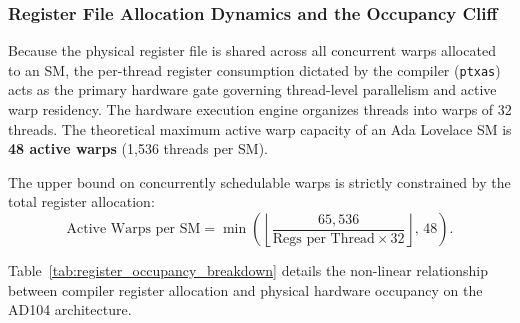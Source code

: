 \subsubsection{Register File Allocation Dynamics and the Occupancy Cliff}
\label{sec:appendix_ada_register_allocation}

Because the physical register file is shared across all concurrent warps allocated to an SM, the per-thread register consumption dictated by the compiler (\texttt{ptxas}) acts as the primary hardware gate governing thread-level parallelism and active warp residency. The hardware execution engine organizes threads into warps of $32$ threads. The theoretical maximum active warp capacity of an Ada Lovelace SM is \textbf{48 active warps} (1,536 threads per SM).

The upper bound on concurrently schedulable warps is strictly constrained by the total register allocation:
\begin{equation}
    \text{Active Warps per SM} = \min \left( \left\lfloor \frac{65,536}{\text{Regs per Thread} \times 32} \right\rfloor, \, 48 \right).
    \label{eq:active_warps_formula}
\end{equation}

Table~\ref{tab:register_occupancy_breakdown} details the non-linear relationship between compiler register allocation and physical hardware occupancy on the AD104 architecture.

